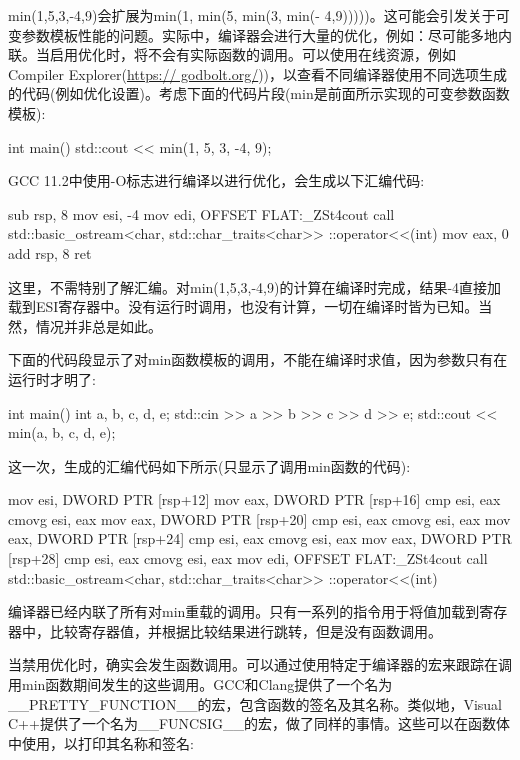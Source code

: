 min(1,5,3,-4,9)会扩展为min(1, min(5, min(3, min(- 4,9)))))。这可能会引发关于可变参数模板性能的问题。实际中，编译器会进行大量的优化，例如：尽可能多地内联。当启用优化时，将不会有实际函数的调用。可以使用在线资源，例如Compiler Explorer(\url{https:// godbolt.org/}))，以查看不同编译器使用不同选项生成的代码(例如优化设置)。考虑下面的代码片段(min是前面所示实现的可变参数函数模板):

\begin{cpp}
int main()
{
	std::cout << min(1, 5, 3, -4, 9);
}
\end{cpp}

GCC 11.2中使用-O标志进行编译以进行优化，会生成以下汇编代码:

\begin{cpp}
sub rsp, 8
mov esi, -4
mov edi, OFFSET FLAT:_ZSt4cout
call std::basic_ostream<char, std::char_traits<char>>
        ::operator<<(int)
mov eax, 0
add rsp, 8
ret
\end{cpp}

这里，不需特别了解汇编。对min(1,5,3,-4,9)的计算在编译时完成，结果-4直接加载到ESI寄存器中。没有运行时调用，也没有计算，一切在编译时皆为已知。当然，情况并非总是如此。

下面的代码段显示了对min函数模板的调用，不能在编译时求值，因为参数只有在运行时才明了:

\begin{cpp}
int main()
{
	int a, b, c, d, e;
	std::cin >> a >> b >> c >> d >> e;
	std::cout << min(a, b, c, d, e);
}
\end{cpp}

这一次，生成的汇编代码如下所示(只显示了调用min函数的代码):

\begin{cpp}
mov esi, DWORD PTR [rsp+12]
mov eax, DWORD PTR [rsp+16]
cmp esi, eax
cmovg esi, eax
mov eax, DWORD PTR [rsp+20]
cmp esi, eax
cmovg esi, eax
mov eax, DWORD PTR [rsp+24]
cmp esi, eax
cmovg esi, eax
mov eax, DWORD PTR [rsp+28]
cmp esi, eax
cmovg esi, eax
mov edi, OFFSET FLAT:_ZSt4cout
call std::basic_ostream<char, std::char_traits<char>>
        ::operator<<(int)
\end{cpp}

编译器已经内联了所有对min重载的调用。只有一系列的指令用于将值加载到寄存器中，比较寄存器值，并根据比较结果进行跳转，但是没有函数调用。

当禁用优化时，确实会发生函数调用。可以通过使用特定于编译器的宏来跟踪在调用min函数期间发生的这些调用。GCC和Clang提供了一个名为\_\_PRETTY\_FUNCTION\_\_的宏，包含函数的签名及其名称。类似地，Visual C++提供了一个名为\_\_FUNCSIG\_\_的宏，做了同样的事情。这些可以在函数体中使用，以打印其名称和签名:


